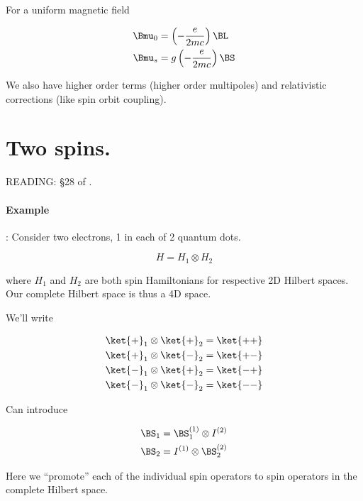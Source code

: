 For a uniform magnetic field

\begin{align}\label{eqn:qmTwoL16:n}
\Bmu_0 &= \left( -\frac{e}{2 m c} \right) \BL \\
\Bmu_s &= g \left( -\frac{e}{2 m c} \right) \BS
\end{align}

We also have higher order terms (higher order multipoles) and relativistic corrections (like spin orbit coupling).

\section{Two spins.}

READING: \S 28 of \cite{desai2009quantum}.

\paragraph{Example}: Consider two electrons, 1 in each of 2 quantum dots.

\begin{equation}\label{eqn:qmTwoL16:n}
H = H_{1} \otimes H_{2}
\end{equation}

where $H_1$ and $H_2$ are both spin Hamiltonians for respective 2D Hilbert spaces.  Our complete Hilbert space is thus a 4D space.

We'll write

\begin{equation}\label{eqn:qmTwoL16:n}
\begin{aligned}
\ket{+}_1 \otimes \ket{+}_2 &= \ket{++} \\
\ket{+}_1 \otimes \ket{-}_2 &= \ket{+-} \\
\ket{-}_1 \otimes \ket{+}_2 &= \ket{-+} \\
\ket{-}_1 \otimes \ket{-}_2 &= \ket{--} 
\end{aligned}
\end{equation}

Can introduce

\begin{align}\label{eqn:qmTwoL16:n}
\BS_1 &= \BS_1^{(1)} \otimes I^{(2)} \\
\BS_2 &= I^{(1)} \otimes \BS_2^{(2)}
\end{align}

Here we ``promote'' each of the individual spin operators to spin operators in the complete Hilbert space.

